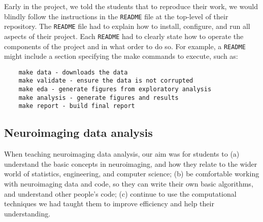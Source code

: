 
Early in the project, we told the students that to reproduce their work, we
would blindly follow the instructions in the \texttt{README} file at the
top-level of their repository.
The \texttt{README} file had to explain how to install, configure,
and run all aspects of their project.
Each \texttt{README} had to clearly state how to operate the
components of the project and in what order to do so.
For example, a \texttt{README} might include a section specifying
the make commands to execute, such as:
\begin{verbatim}
    make data - downloads the data 
    make validate - ensure the data is not corrupted
    make eda - generate figures from exploratory analysis
    make analysis - generate figures and results
    make report - build final report
\end{verbatim}


%
\subsection{Neuroimaging data analysis}\label{analysis}

When teaching neuroimaging data analysis, our aim was for students to
(a) understand the basic concepts in neuroimaging,
and how they relate to the wider world of statistics, engineering, and computer science;
(b) be comfortable working with neuroimaging data and code, so they can write
their own basic algorithms, and understand other people's code;
(c) continue to use the computational techniques we had taught them to improve
efficiency and help their understanding.

